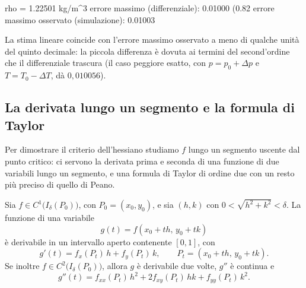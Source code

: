 \begin{risultato}
rho = 1.22501 kg/m^3
errore massimo (differenziale): 0.01000  (0.82%
errore massimo osservato (simulazione): 0.01003
\end{risultato}

La stima lineare coincide con l'errore massimo osservato a meno di qualche unità del
quinto decimale: la piccola differenza è dovuta ai termini del second'ordine che il
differenziale trascura (il caso peggiore esatto, con $p=p_{0}+\Delta p$ e $T=T_{0}-\Delta T$,
dà $0{,}010056$).

\subsection{La derivata lungo un segmento e la formula di Taylor}

Per dimostrare il criterio dell'hessiano studiamo $f$ lungo un segmento uscente dal
punto critico: ci servono la derivata prima e seconda di una funzione di due variabili
lungo un segmento, e una formula di Taylor di ordine due con un resto più preciso di
quello di Peano.

\begin{lemma}\label{lem:derivata-segmento}
Sia $f\in C^{1}\bigl(I_{\delta}(P_{0})\bigr)$, con $P_{0}=(x_{0},y_{0})$, e sia $(h,k)$ con
$0<\sqrt{h^{2}+k^{2}}<\delta$. La funzione di una variabile
\begin{equation}\label{eq:g-segmento}
  g(t)=f(x_{0}+th,\,y_{0}+tk)
\end{equation}
è derivabile in un intervallo aperto contenente $[0,1]$, con
\begin{equation}\label{eq:g-primo}
  g'(t)=f_{x}(P_{t})\,h+f_{y}(P_{t})\,k, \qquad P_{t}=(x_{0}+th,\,y_{0}+tk).
\end{equation}
Se inoltre $f\in C^{2}\bigl(I_{\delta}(P_{0})\bigr)$, allora $g$ è derivabile due volte, $g''$ è
continua e
\begin{equation}\label{eq:g-secondo}
  g''(t)=f_{xx}(P_{t})\,h^{2}+2f_{xy}(P_{t})\,hk+f_{yy}(P_{t})\,k^{2} .
\end{equation}
\end{lemma}

